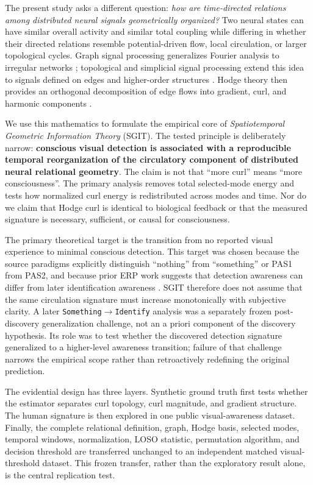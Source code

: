 \documentclass[12pt]{article}
\begin{document}
The present study asks a different question: \emph{how are time-directed relations among distributed neural signals geometrically organized?} Two neural states can have similar overall activity and similar total coupling while differing in whether their directed relations resemble potential-driven flow, local circulation, or larger topological cycles. Graph signal processing generalizes Fourier analysis to irregular networks \citep{Shuman2013}; topological and simplicial signal processing extend this idea to signals defined on edges and higher-order structures \citep{BarbarossaSardellitti2020,Schaub2021}. Hodge theory then provides an orthogonal decomposition of edge flows into gradient, curl, and harmonic components \citep{Jiang2011}.

We use this mathematics to formulate the empirical core of \emph{Spatiotemporal Geometric Information Theory} (SGIT). The tested principle is deliberately narrow: \textbf{conscious visual detection is associated with a reproducible temporal reorganization of the circulatory component of distributed neural relational geometry}. The claim is not that ``more curl'' means ``more consciousness''. The primary analysis removes total selected-mode energy and tests how normalized curl energy is redistributed across modes and time. Nor do we claim that Hodge curl is identical to biological feedback or that the measured signature is necessary, sufficient, or causal for consciousness.

The primary theoretical target is the transition from no reported visual experience to minimal conscious detection. This target was chosen because the source paradigms explicitly distinguish ``nothing'' from ``something'' or PAS1 from PAS2, and because prior ERP work suggests that detection awareness can differ from later identification awareness \citep{EklundWiens2018,Wiens2026}. SGIT therefore does not assume that the same circulation signature must increase monotonically with subjective clarity. A later \texttt{Something}$\rightarrow$\texttt{Identify} analysis was a separately frozen post-discovery generalization challenge, not an a priori component of the discovery hypothesis. Its role was to test whether the discovered detection signature generalized to a higher-level awareness transition; failure of that challenge narrows the empirical scope rather than retroactively redefining the original prediction.

The evidential design has three layers. Synthetic ground truth first tests whether the estimator separates curl topology, curl magnitude, and gradient structure. The human signature is then explored in one public visual-awareness dataset. Finally, the complete relational definition, graph, Hodge basis, selected modes, temporal windows, normalization, LOSO statistic, permutation algorithm, and decision threshold are transferred unchanged to an independent matched visual-threshold dataset. This frozen transfer, rather than the exploratory result alone, is the central replication test.
\end{document}

